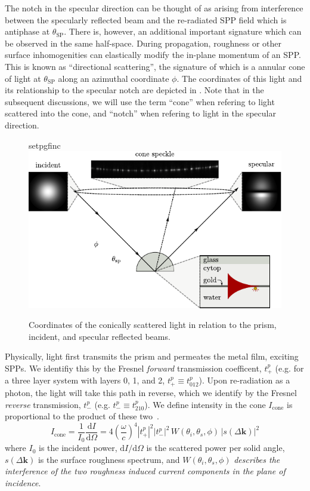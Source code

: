 The notch in the specular direction can be thought of as arising from 
interference between the specularly reflected beam and the
re-radiated SPP field which is antiphase at $\theta_\mathrm{SP}$.  There
is, however, an additional important signature which can be observed in the
same half-space.  During propagation, roughness or other surface
inhomogenities can elastically modify the in-plane momentum of an SPP.
This is known as ``directional scattering'', the signature of which is a
annular cone of light at $\theta_\mathrm{SP}$ along an azimuthal coordinate
$\phi$.  The coordinates of this light and its relationship to the specular
notch are depicted in .  Note that in the subsequent
discussions, we will use the term ``cone'' when refering to light scattered
into the cone, and ``notch'' when refering to light in the specular
direction.
\begin{figure}[ht]
 \centering
 {setpgfinc}
 \includegraphics{existence/figures/conefig}
 \caption{Coordinates of the conically scattered light in relation to the
 prism, incident, and specular reflected beams.}
 \label{fig:conefig}
\end{figure}

Physically, light first transmits the prism and permeates the metal film,
exciting SPPs.  We identifiy this by the Fresnel \textit{forward}
transmission coefficent, $t^p_+$ (e.g. for a three layer system with layers
0, 1, and 2, $t^p_+ \equiv t^p_{012}$).  Upon re-radiation as a photon, the
light will take this path in reverse, which we identify by the Fresnel
\textit{reverse} transmission, $t^p_-$ (e.g. $t^p_- \equiv t^p_{210}$).  We
define intensity in the cone $I_\mathrm{cone}$ is proportional to the
product of these two~\cite{simon1976directional}.
\begin{equation}
I_\mathrm{cone} 
= \frac{1}{I_0}\frac{\mathrm{d}I}{\mathrm{d}\Omega} 
= 4 \left(\frac{\omega}{c}\right)^4 |t^p_+|^2
|t^p_-|^2\,W(\theta_i,\theta_s,\phi)\, |s(\Delta \mathbf{k})|^2
\label{eqn:guhacone}
\end{equation}
where $I_0$ is the incident power, $\mathrm{d}I/\mathrm{d}\Omega$ is the
scattered power per solid angle, $s(\Delta \mathbf{k})$ is the surface
roughness spectrum, and $W(\theta_i,\theta_s,\phi)$ \textit{describes the
								interference of the two roughness induced current components in the
plane of incidence}.

